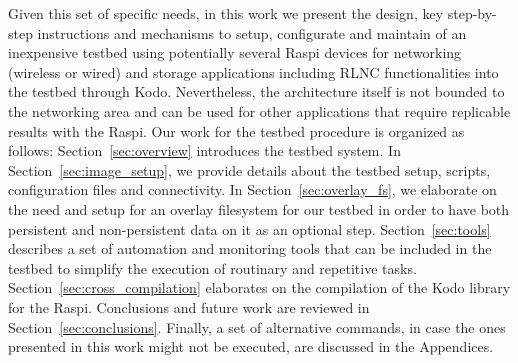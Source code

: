 Given this set of specific needs, in this work we present the design, key step-by-step instructions and mechanisms to setup, configurate and maintain of an inexpensive testbed using potentially several \ac{Raspi} devices for networking (wireless or wired) and storage applications including \ac{RLNC} functionalities into the testbed through Kodo. Nevertheless, the architecture itself is not bounded to the networking area and can be used for other applications that require replicable results with the \ac{Raspi}. Our work for the testbed procedure is organized as follows: Section~\ref{sec:overview} introduces the testbed system. In Section~\ref{sec:image_setup}, we provide details about the testbed setup, scripts, configuration files and connectivity. In Section~\ref{sec:overlay_fs}, we elaborate on the need and setup for an overlay filesystem for our testbed in order to have both persistent and non-persistent data on it as an optional step. Section~\ref{sec:tools} describes a set of automation and monitoring tools that can be included in the testbed to simplify the execution of routinary and repetitive tasks. Section~\ref{sec:cross_compilation} elaborates on the compilation of the Kodo library for the \ac{Raspi}. Conclusions and future work are reviewed in Section~\ref{sec:conclusions}. Finally, a set of alternative commands, in case the ones presented in this work might not be executed, are discussed in the Appendices.

